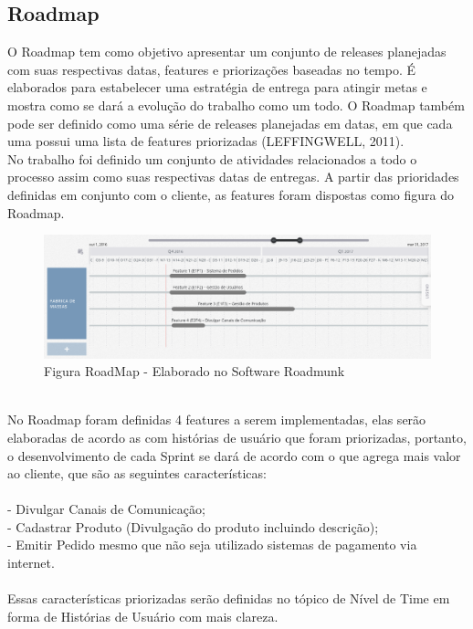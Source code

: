 \subsection{Roadmap}
O Roadmap tem como objetivo apresentar um conjunto de releases planejadas com suas respectivas datas, features e priorizações baseadas no tempo. É elaborados para estabelecer uma estratégia de entrega para atingir metas e mostra como se dará a evolução do trabalho como um todo. O Roadmap também pode ser definido como uma série de releases planejadas em datas, em que cada uma possui uma lista de features priorizadas (LEFFINGWELL, 2011).\\
\tab No trabalho foi definido um conjunto de atividades relacionados a todo o processo assim como suas respectivas datas de entregas. A partir das prioridades definidas em conjunto com o cliente, as features foram dispostas como figura do Roadmap.\\
\begin{figure}[h]
    \centering
    \label{fig01}
        \includegraphics[keepaspectratio=true,scale=0.3]{figuras/roadmunk.eps}
    \caption{Figura RoadMap - Elaborado no Software Roadmunk}
\end{figure}
\\
\tab No Roadmap foram definidas 4 features a serem implementadas, elas serão elaboradas de acordo as com histórias de usuário que foram priorizadas, portanto, o desenvolvimento de cada Sprint se dará de acordo com o que agrega mais valor ao cliente, que são as seguintes características:\\
\\
\tab - Divulgar Canais de Comunicação;\\
\tab - Cadastrar Produto (Divulgação do produto incluindo descrição);\\
\tab - Emitir Pedido mesmo que não seja utilizado sistemas de pagamento via internet.\\
\\
Essas características priorizadas serão definidas no tópico de Nível de Time em forma de Histórias de Usuário com mais clareza.\\

